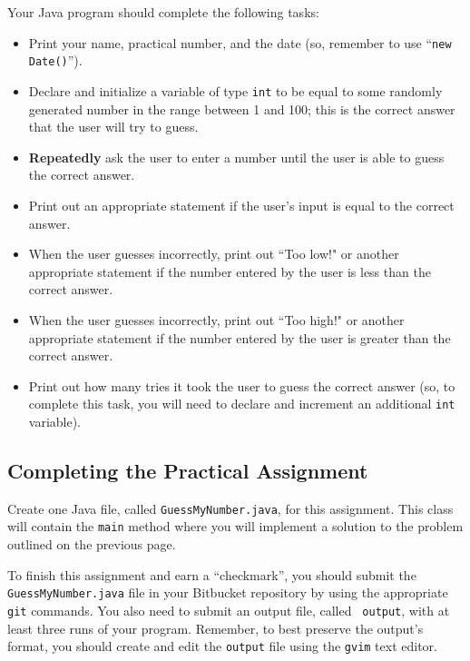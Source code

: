 \noindent
Your Java program should complete the following tasks:

\begin{itemize}

  \item Print your name, practical number, and the date (so, remember to use ``{\tt new Date()}'').

  \item Declare and initialize a variable of type {\tt int} to be equal to some randomly generated number in the range
    between 1 and 100; this is the correct answer that the user will try to guess.

  \item \textbf{Repeatedly} ask the user to enter a number until the user is able to guess the correct answer.

  \item Print out an appropriate statement if the user's input is equal to the correct answer.

  \item When the user guesses incorrectly, print out ``Too low!" or another appropriate statement if the number entered
    by the user is less than the correct answer.

  \item When the user guesses incorrectly, print out ``Too high!" or another appropriate statement if the number entered
    by the user is greater than the correct answer.

  \item Print out how many tries it took the user to guess the correct answer (so, to complete this task, you will need
    to declare and increment an additional {\tt int} variable).

\end{itemize}

\vspace*{-.1in}
\subsection*{Completing the Practical Assignment}

\vspace*{-.1in}

Create one Java file, called {\tt GuessMyNumber.java}, for this assignment.  This class will contain the {\tt main} method
where you will implement a solution to the problem outlined on the previous page.

\noindent To finish this assignment and earn a ``checkmark'', you should submit the {\tt GuessMyNumber.java} file in your
Bitbucket repository by using the appropriate {\tt git} commands. You also need to submit an output file, called {\tt
output}, with at least three runs of your program. Remember, to best preserve the output's format, you should
create and edit the {\tt output} file using the {\tt gvim} text editor.

